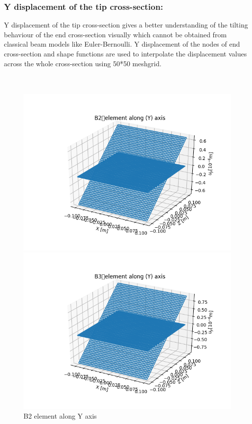 \documentclass[a4paper,12pt]{article}
\begin{document}
\subsubsection*{Y displacement of the tip cross-section:}
\indent\indent\indent\indent Y displacement of the tip cross-section gives a better understanding of the tilting behaviour of the end cross-section visually which cannot be obtained from classical beam models like Euler-Bernoulli. Y displacement of the nodes of end cross-section and shape functions are used to interpolate the displacement values across the whole cross-section using 50*50 meshgrid. 
\\
\\
\\
\begin{figure}[!htbp]
  \centering
  \begin{minipage}[b]{0.45\textwidth}
    \includegraphics[width=\textwidth]{15.png}
    \caption{B2 element along Y axis}
    \label{fig: Y_B2}
  \end{minipage}
  \hfill
  \begin{minipage}[b]{0.45\textwidth}
    \includegraphics[width=\textwidth]{16.png}

\end{minipage}
\end{figure}
\end{document}
